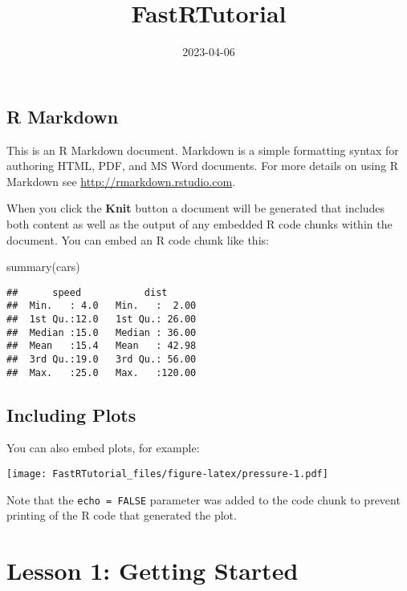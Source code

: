 \documentclass[
]{article}
\title{FastRTutorial}
\author{}
\date{\vspace{-2.5em}2023-04-06}
\newenvironment{Shaded}{\begin{snugshade}}{\end{snugshade}}
\newcommand{\FunctionTok}[1]{\textcolor[rgb]{0.00,0.00,0.00}{#1}}
\newcommand{\NormalTok}[1]{#1}
\begin{document}
\maketitle

\hypertarget{r-markdown}{%
\subsection{R Markdown}\label{r-markdown}}

This is an R Markdown document. Markdown is a simple formatting syntax
for authoring HTML, PDF, and MS Word documents. For more details on
using R Markdown see \url{http://rmarkdown.rstudio.com}.

When you click the \textbf{Knit} button a document will be generated
that includes both content as well as the output of any embedded R code
chunks within the document. You can embed an R code chunk like this:

\begin{Shaded}
\begin{Highlighting}[]
\FunctionTok{summary}\NormalTok{(cars)}
\end{Highlighting}
\end{Shaded}

\begin{verbatim}
##      speed           dist       
##  Min.   : 4.0   Min.   :  2.00  
##  1st Qu.:12.0   1st Qu.: 26.00  
##  Median :15.0   Median : 36.00  
##  Mean   :15.4   Mean   : 42.98  
##  3rd Qu.:19.0   3rd Qu.: 56.00  
##  Max.   :25.0   Max.   :120.00
\end{verbatim}

\hypertarget{including-plots}{%
\subsection{Including Plots}\label{including-plots}}

You can also embed plots, for example:

\texttt{[image: FastRTutorial\_files/figure-latex/pressure-1.pdf]}

Note that the \texttt{echo\ =\ FALSE} parameter was added to the code
chunk to prevent printing of the R code that generated the plot.

\hypertarget{lesson-1-getting-started}{%
\section{Lesson 1: Getting Started}\label{lesson-1-getting-started}}
\end{document}
